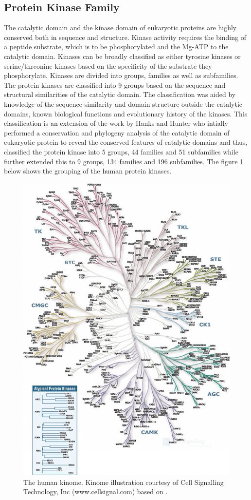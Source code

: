 \documentclass[a4paper, 11pt]{article}
\begin{document}
\subsection*{Protein Kinase Family}
The catalytic domain and the kinase domain of eukaryotic proteins are highly conserved both in sequence and structure. Kinase activity requires the binding of a peptide substrate, which is to be phosphorylated and the Mg-ATP to the catalytic domain. Kinases can be broadly classified as either tyrosine kinases or serine/threonine kinases based on the specificity of the substrate they phosphorylate. Kinases are divided into groups, families as well as subfamilies. The protein kinases are classified into 9 groups based on the sequence and structural similarities of the catalytic domain. The classification was aided by knowledge of the sequence similarity and domain structure outside the catalytic domains, known biological functions and evolutionary history of the kinases. This classification is an extension of the work by Hanks and Hunter who intially performed a conservation and phylogeny analysis of the catalytic domain of eukaryotic protein to reveal the conserved features of catalytic domains and thus, classified the protein kinase into 5 groups, 44 families and 51 subfamilies \cite{hanks1995protein} while \cite{manning2002protein} further extended this to 9 groups, 134 families and 196 subfamilies. The figure \ref{KinomeDendogram} below shows the grouping of the human protein kinases.\\
\begin{figure}[H]
	\includegraphics[width=.8\linewidth]{figures/kinome.jpg}
	\centering
	\caption{The human kinome. Kinome illustration courtesy of Cell Signalling 			Technology, Inc (www.cellsignal.com) based on \cite{manning2002protein}.}
	\label{KinomeDendogram}
\end{figure}
\end{document}
